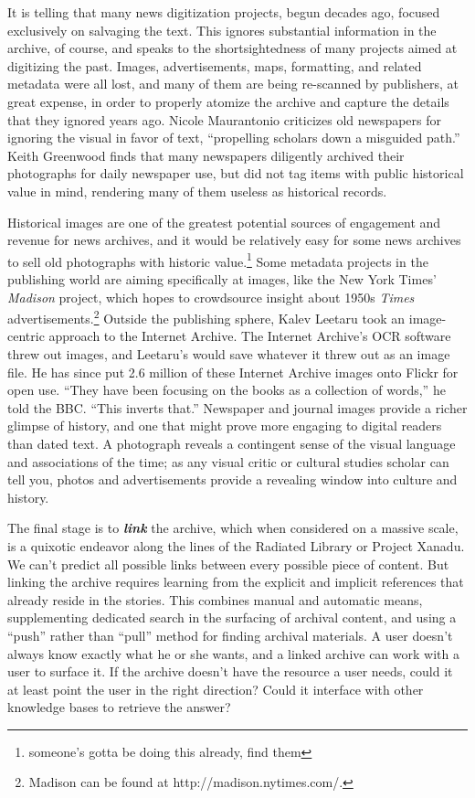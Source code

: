It is telling that many news digitization projects, begun decades ago, focused exclusively on salvaging the text. This ignores substantial information in the archive, of course, and speaks to the shortsightedness of many projects aimed at digitizing the past. Images, advertisements, maps, formatting, and related metadata were all lost, and many of them are being re-scanned by publishers, at great expense, in order to properly atomize the archive and capture the details that they ignored years ago. Nicole Maurantonio criticizes old newspapers for ignoring the visual in favor of text, ``propelling scholars down a misguided path.''\autocite[90]{maurantonio_archiving_2014} Keith Greenwood finds that many newspapers diligently archived their photographs for daily newspaper use, but did not tag items with public historical value in mind, rendering many of them useless as historical records.\autocite{greenwood_digital_2011}

Historical images are one of the greatest potential sources of engagement and revenue for news archives, and it would be relatively easy for some news archives to sell old photographs with historic value.\footnote{someone's gotta be doing this already, find them} Some metadata projects in the publishing world are aiming specifically at images, like the New York Times' \emph{Madison} project, which hopes to crowdsource insight about 1950s \emph{Times} advertisements.\footnote{Madison can be found at http://madison.nytimes.com/.} Outside the publishing sphere, Kalev Leetaru took an image-centric approach to the Internet Archive. The Internet Archive's OCR software threw out images, and Leetaru's would save whatever it threw out as an image file. He has since put 2.6 million of these Internet Archive images onto Flickr for open use. ``They have been focusing on the books as a collection of words,'' he told the BBC. ``This inverts that.''\autocite{kelion_millions_2014} Newspaper and journal images provide a richer glimpse of history, and one that might prove more engaging to digital readers than dated text. A photograph reveals a contingent sense of the visual language and associations of the time; as any visual critic or cultural studies scholar can tell you, photos and advertisements provide a revealing window into culture and history.\autocite{sontag_photography_1977,barthes_rhetoric_1978}

The final stage is to \textbf{\emph{link}} the archive, which when considered on a massive scale, is a quixotic endeavor along the lines of the Radiated Library or Project Xanadu. We can't predict all possible links between every possible piece of content. But linking the archive requires learning from the explicit and implicit references that already reside in the stories. This combines manual and automatic means, supplementing dedicated search in the surfacing of archival content, and using a ``push'' rather than ``pull'' method for finding archival materials. A user doesn't always know exactly what he or she wants, and a linked archive can work with a user to surface it. If the archive doesn't have the resource a user needs, could it at least point the user in the right direction? Could it interface with other knowledge bases to retrieve the answer?

